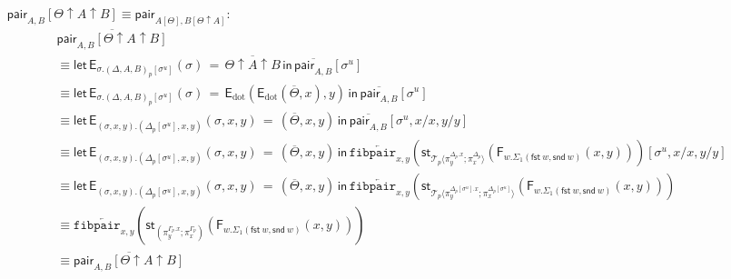 \documentclass[10pt]{article}
\theoremstyle{definition}
\newcommand\dsd[1]{\ensuremath{\mathsf{#1}}}
\newcommand{\app}[2]{\ensuremath{#1 \: #2}}
\newcommand{\fst}[1]{\app{\dsd{fst}}{#1}}
\newcommand{\snd}[1]{\app{\dsd{snd}}{#1}}
\newcommand{\rewrite}[2]{\overleftarrow{#1}(#2)}
\newcommand\StI[2]{\ensuremath{\mathsf{st}_{#1}(#2)}}
\newcommand\FIs[2]{\ensuremath{\mathsf{F}_{#1}{(#2)}}}
\newcommand\EEs[4]{\ensuremath{\mathsf{let} \, \mathsf{E}_{#1}(#3) \, = \, {#2} \, \mathsf{in} \, #4}}
\newcommand\EIs[2]{\ensuremath{\mathsf{E}_{#1}{(#2)}}}
\newcommand\ApEl[2]{\mathcal{T}_{#1}\langle#2\rangle}
\newcommand\unp[2]{\ensuremath{{#2}^u}}
\newcommand{\modeof}[1]{{#1}_p}
\newcommand{\sdot}{\ensuremath{\mathrm{dot}}}
\newcommand{\upstairs}[1]{\overline{#1}}
\newcommand\fibpair[1]{\ensuremath{\mathtt{fibpair}_{#1}}}
\newcommand\qpair[1]{\ensuremath{\mathsf{pair}_{#1}}}
\begin{document}
\begin{enumerate}[style = multiline, labelwidth = 80pt]
\item[{$\qpair{A, B}[\Theta \uparrow A \uparrow B] \equiv \qpair{A[\Theta], B[\Theta \uparrow A]}$}:]
\begin{align*}
&\upstairs{\qpair{A, B}[\Theta \uparrow A \uparrow B]} \\
&\equiv \EEs{\sigma. \modeof{(\Delta, A, B)}[\unp{\Delta, A, B}{\sigma}]}{\upstairs{\Theta \uparrow A \uparrow B}}{\sigma}{\upstairs{\qpair{A, B}}[\unp{\Delta, A, B}{\sigma}]} \\
&\equiv \EEs{\sigma. \modeof{(\Delta, A, B)}[\unp{\Delta, A, B}{\sigma}]}{\EIs{\sdot}{\EIs{\sdot}{\upstairs{\Theta}, x}, y}}{\sigma}{\upstairs{\qpair{A, B}}[\unp{\Delta, A, B}{\sigma}]} \\
&\equiv \EEs{(\sigma, x, y).(\modeof{\Delta}[\unp{\Delta}{\sigma}], x, y)}{(\upstairs{\Theta},x,y)}{\sigma,x,y}{\upstairs{\qpair{A, B}}[\unp{\Delta}{\sigma}, x/x, y/y]} \\
&\equiv \EEs{(\sigma, x, y).(\modeof{\Delta}[\unp{\Delta}{\sigma}], x, y)}{(\upstairs{\Theta},x,y)}{\sigma,x,y}{\rewrite{\fibpair{x,y}}{\StI{\ApEl{p}{\pi^{\modeof{\Delta}.x}_y;\pi^{\modeof{\Delta}}_x}}{\FIs{w. \Sigma_1(\fst w, \snd w)}{x,y}}}[\unp{\Delta}{\sigma}, x/x, y/y]} \\
&\equiv \EEs{(\sigma, x, y).(\modeof{\Delta}[\unp{\Delta}{\sigma}], x, y)}{(\upstairs{\Theta},x,y)}{\sigma,x,y}{\rewrite{\fibpair{x,y}}{\StI{\ApEl{p}{\pi^{\modeof{\Delta}[\unp{\Delta}{\sigma}].x}_y;\pi^{\modeof{\Delta}[\unp{\Delta}{\sigma}]}_x}}{\FIs{w. \Sigma_1(\fst w, \snd w)}{x,y}}}} \\
&\equiv \rewrite{\fibpair{x,y}}{\StI{(\pi^{\modeof{\Gamma}.x}_y;\pi^{\modeof{\Gamma}}_x)}{\FIs{w. \Sigma_1(\fst w, \snd w)}{x,y}}} \\
&\equiv \upstairs{\qpair{A, B}[\Theta \uparrow A \uparrow B]}
\end{align*}


\end{enumerate}
\end{document}
